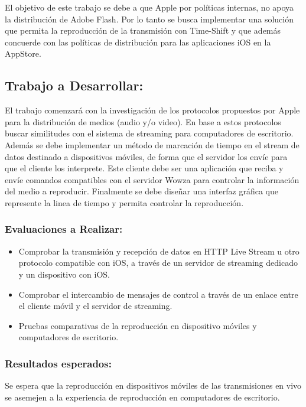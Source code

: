 El objetivo de este trabajo se debe a que Apple por políticas internas, no apoya la distribuci\'on de Adobe Flash. Por lo tanto se busca implementar una soluci\'on que permita la reproducci\'on de la transmisi\'on con Time-Shift y que adem\'as concuerde con las pol\'iticas de distribuci\'on para las aplicaciones iOS en la AppStore.\\
 
\large
\subsection*{Trabajo a Desarrollar:}
\normalsize
El trabajo comenzar\'a con la investigaci\'on de los protocolos propuestos por Apple para la distribuci\'on de medios (audio y/o video). En base a estos protocolos buscar similitudes con el sistema de streaming para computadores de escritorio. Adem\'as se debe implementar un m\'etodo de marcaci\'on de tiempo en el stream de datos destinado a dispositivos m\'oviles, de forma que el servidor los env\'ie para que el cliente los interprete. Este cliente debe ser una aplicaci\'on que reciba y env\'ie comandos compatibles con el servidor Wowza para controlar la informaci\'on del medio a reproducir. Finalmente se debe dise\~nar una interfaz gr\'afica que represente la linea de tiempo y permita controlar la reproducción.\\

\subsubsection*{Evaluaciones a Realizar:}
\normalsize
\begin{itemize}
\item	Comprobar la transmisión y recepción de datos en HTTP Live Stream u otro protocolo compatible con iOS, a través de un servidor de streaming dedicado y un dispositivo con iOS.
\item	Comprobar el intercambio de mensajes de control a través de un enlace entre el cliente móvil y el servidor de streaming.
\item	Pruebas comparativas de la reproducción en dispositivo móviles y computadores de escritorio.
\end{itemize}

\subsubsection*{Resultados esperados:}
\normalsize
Se espera que la reproducción en dispositivos móviles de las transmisiones en vivo se asemejen a la experiencia de reproducción en computadores de escritorio.\\

